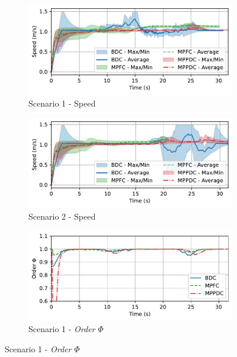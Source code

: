 \begin{figure}[h!]
    \centering
    \begin{subfigure}[b]{0.495\textwidth}
    \includegraphics[width=\textwidth]{paper3/images/velocity_scen1.pdf}
    \caption{Scenario 1 - Speed}
    \label{fig:speed1}
    \end{subfigure}
    \begin{subfigure}[b]{0.495\textwidth}
    \includegraphics[width=\textwidth]{paper3/images/velocity_scen2.pdf}
    \caption{Scenario 2 - Speed}
    \label{fig:speed2}
    \end{subfigure}
    \begin{subfigure}[b]{0.495\textwidth}
    \includegraphics[width=\textwidth]{paper3/images/order_scen1.pdf}
    \caption{Scenario 1 - \textit{Order} $\Phi$}
    \label{fig:order1}
    \end{subfigure}

\end{figure}
